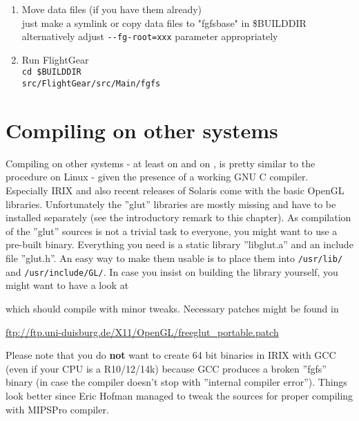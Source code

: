 \begin{enumerate}
\item Move data files (if you have them already)\\
 just make a symlink or copy data files to "fgfsbase" in {\$}BUILDDIR\\
 alternatively adjust \texttt{-$ $-fg-root=xxx} parameter appropriately

\item Run FlightGear\\
 \texttt{cd {\$}BUILDDIR}\\
 \texttt{src/FlightGear/src/Main/fgfs}
\end{enumerate}

\section{Compiling on other systems}

Compiling on other  systems - at least on  and on
, is pretty similar to the procedure on Linux - given the presence of a working GNU C compiler. Especially IRIX and also recent releases of Solaris come with the
basic OpenGL libraries. Unfortunately the ''glut'' libraries are
mostly missing and have to be installed separately (see the introductory remark to this chapter). As compilation
of the ''glut'' sources is not a trivial task to everyone, you might want to use a
pre-built binary. Everything you need is a static library ''libglut.a'' and an include
file ''glut.h''. An easy way to make them usable is to place them into \texttt{/usr/lib/}
and \texttt{/usr/include/GL/}. In case you insist on building the library yourself, you
might want to have a look at 
\medskip

 \medskip

 \noindent
which should compile with minor tweaks. Necessary patches might be found in
\medskip

\href{ftp://ftp.uni-duisburg.de/X11/OpenGL/freeglut_portable.patch}{ftp://ftp.uni-duisburg.de/X11/OpenGL/freeglut\_portable.patch}
 \medskip

 \noindent
Please note that you do \textbf{not} want to create 64 bit binaries in IRIX
with GCC (even if your CPU is a R10/12/14k) because GCC produces a broken
''fgfs'' binary (in case the compiler doesn't stop with ''internal compiler
error''). Things look better since Eric Hofman
managed to tweak the \FlightGear{} sources for proper compiling with MIPSPro
compiler.

